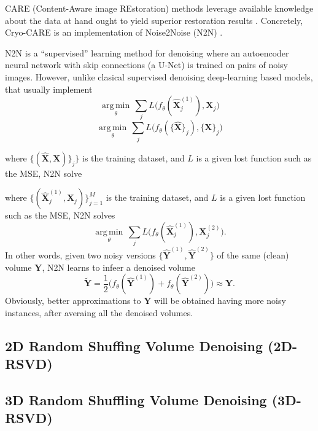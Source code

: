 \documentclass{article}
\begin{document}
CARE (Content-Aware image REstoration) methods leverage available
knowledge about the data at hand ought to yield superior restoration
results \cite{weigert2018content}. Concretely, Cryo-CARE
\cite{buchholz2019cryo} is an implementation of Noise2Noise (N2N)
\cite{lehtinen2018noise2noise}.

N2N is a ``supervised'' learning method for denoising where an
autoencoder neural network with skip connections (a U-Net) is trained
on pairs of noisy images. However, unlike clasical supervised
denoising deep-learning based models, that usually implement
\cite{lehtinen2018noise2noise}
\begin{equation}
  \underset{\theta}{\operatorname{arg\,min}} \, \sum_j L \big(f_\theta(\hat{\mathbf X}_j^{(1)}), {\mathbf X}_j\big)
\end{equation}
\begin{equation}
  \underset{\theta}{\operatorname{arg\,min}} \, \sum_j L \big(f_\theta(\{\hat{\mathbf X}\}_j), \{{\mathbf X}\}_j\big)
\end{equation}

where $\{(\hat{\mathbf{X}}, \mathbf{X})\}_j\}$ is the training
dataset, and $L$ is a given lost function such as the MSE, N2N solve

where $\{(\hat{\mathbf X}_j^{(1)}, {\mathbf X}_j)\}_{j=1}^M$ is the training
dataset, and $L$ is a given lost function such as the MSE, N2N solves
\begin{equation}
  \underset{\theta}{\operatorname{arg\,min}} \, \sum_j L \big(f_\theta(\hat{\mathbf X}_j^{(1)}), {\mathbf X}_j^{(2)}\big).
\end{equation}
In other words, given two noisy versions
$\{\hat{\mathbf Y}^{(1)}, \hat{\mathbf Y}^{(2)}\}$ of the same (clean)
volume ${\mathbf Y}$, N2N learns to infeer a denoised volume
\begin{equation}
  \tilde{\mathbf Y}=\frac{1}{2}\big(f_\theta(\hat{\mathbf Y}^{(1)})+f_\theta(\hat{\mathbf Y}^{(2)})\big)\approx{\mathbf Y}.
\end{equation}
Obviously, better approximations to ${\mathbf Y}$ will be obtained
having more noisy instances, after averaing all the denoised volumes.


\subsection{2D Random Shuffing Volume Denoising (2D-RSVD)}

\subsection{3D Random Shuffling Volume Denoising (3D-RSVD)}
\end{document}
